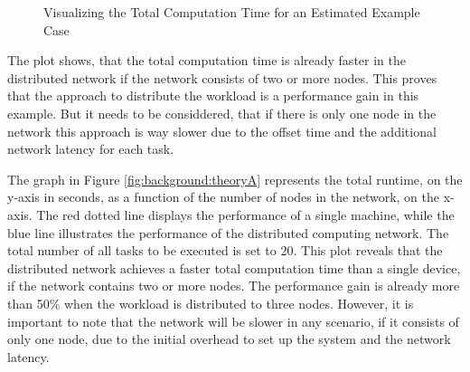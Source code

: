 \begin{figure}[bth]
  \myfloatalign
   \caption{Visualizing the Total Computation Time for an Estimated Example Case}
   \label{fig:background:theoryplot}
\end{figure}

The plot shows, that the total computation time is already faster in the distributed network if the network consists of two or more nodes. This proves that the approach to distribute the workload is a performance gain in this example. But it needs to be considdered, that if there is only one node in the network this approach is way slower due to the offset time and the additional network latency for each task.

The graph in Figure \ref{fig:background:theoryA} represents the total runtime, on the y-axis in seconds, as a function of the number of nodes in the network, on the x-axis. The red dotted line displays the performance of a single machine, while the blue line illustrates the performance of the distributed computing network. The total number of all tasks to be executed is set to 20. This plot reveals that the distributed network achieves a faster total computation time than a single device, if the network contains two or more nodes. The performance gain is already more than 50\% when the workload is distributed to three nodes. However, it is important to note that the network will be slower in any scenario, if it consists of only one node, due to the initial overhead to set up the system and the network latency.

